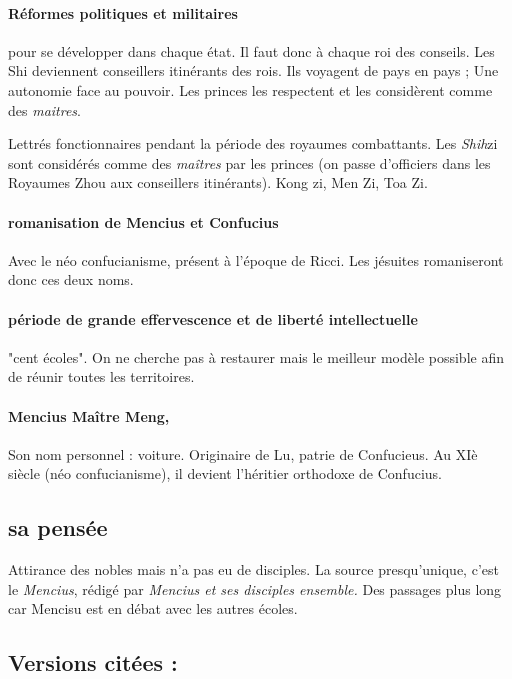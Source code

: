  



\paragraph{Réformes politiques et militaires} pour se développer dans chaque état. Il faut donc à chaque roi des conseils. Les Shi deviennent conseillers itinérants des rois. Ils voyagent de pays en pays ; Une autonomie face au pouvoir. Les princes les respectent et les considèrent comme des \textit{maitres}. 
\begin{Def}[shi(h) - 士 ]
    Lettrés fonctionnaires pendant la période des royaumes combattants.     Les \textit{Shih}{zi} sont considérés comme des \textit{maîtres} par les princes (on passe d'officiers dans les Royaumes Zhou aux conseillers itinérants). Kong zi, Men Zi, Toa Zi. 
\end{Def}
\paragraph{romanisation de Mencius et Confucius} Avec le néo confucianisme, présent à l'époque de Ricci. Les jésuites romaniseront donc ces deux noms.

\paragraph{période de grande effervescence et de liberté intellectuelle} "cent écoles". On ne cherche pas à restaurer mais le meilleur modèle possible afin de réunir toutes les territoires.

\paragraph{Mencius Maître Meng,}
 Son nom personnel : voiture. Originaire de Lu, patrie de Confucieus. Au XIè siècle (néo confucianisme), il devient l'héritier orthodoxe de Confucius.

\subsection{sa pensée}

Attirance des nobles mais n'a pas eu de disciples.
La source presqu'unique, c'est le \textit{Mencius}, rédigé par \textit{Mencius et ses disciples ensemble.} Des passages plus long car Mencisu est en débat avec les autres écoles. 

\subsection{Versions citées :}

